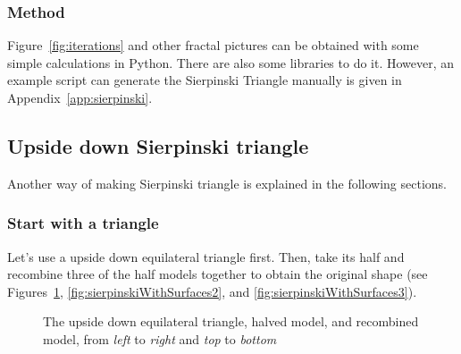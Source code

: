 \subsubsection{Method}
Figure~\ref{fig:iterations} and other fractal pictures can be obtained with some simple calculations in Python.
There are also some libraries to do it. 
However, an example script can generate the Sierpinski Triangle manually is given in Appendix~\ref{app:sierpinski}.

\textcolor{gray}{
\lipsum[2][1-7]
}

\subsection{Upside down Sierpinski triangle}
Another way of making Sierpinski triangle is explained in the following sections.

\subsubsection{Start with a triangle}
Let's use a upside down equilateral triangle first. 
Then, take its half and recombine three of the half models together to obtain the original shape
(see Figures~\ref{fig:sierpinskiWithSurfaces1},
\ref{fig:sierpinskiWithSurfaces2}, and
\ref{fig:sierpinskiWithSurfaces3}).

\begin{figure}[ht!]
\centering
{}
\caption{The upside down equilateral triangle, halved model, and recombined model, from \textit{left} to \textit{right} and \textit{top} to \textit{bottom}}
\label{fig:sierpinskiWithSurfaces1}
\end{figure}


